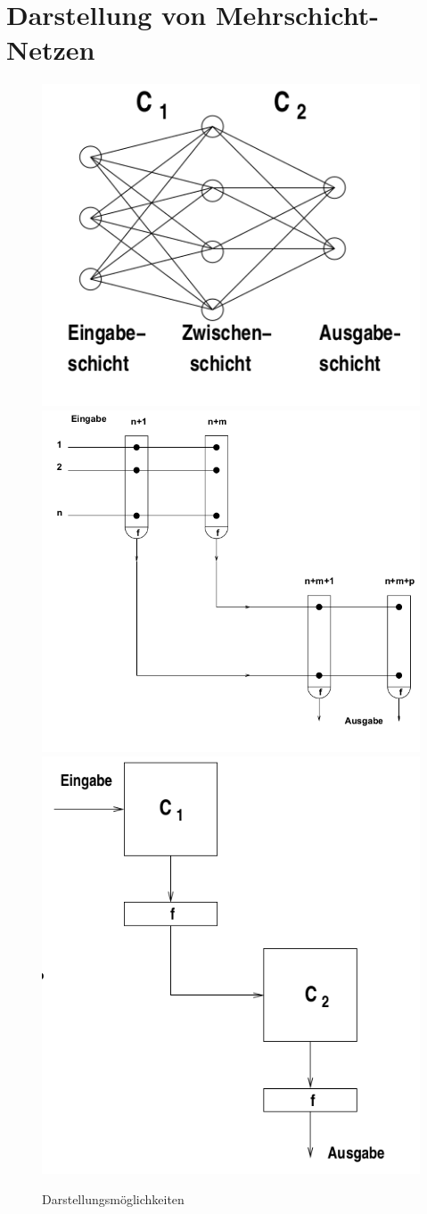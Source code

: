 \section{Darstellung von Mehrschicht-Netzen}
\begin{figure}[h]
    \centering
    \includegraphics[width=.3\textwidth]{img/NeuronaleArchitekturen/d1.png}\hfill
    \includegraphics[width=.3\textwidth]{img/NeuronaleArchitekturen/d2.png}\hfill
    \includegraphics[width=.3\textwidth]{img/NeuronaleArchitekturen/d3.png}
    
    \caption{Darstellungsmöglichkeiten}
    \label{ch_arch_darst}
\end{figure}